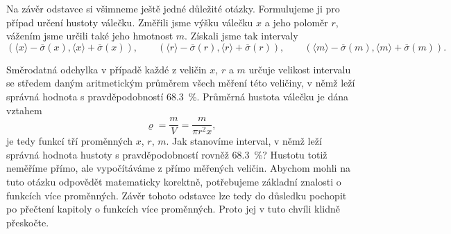       
      Na závěr odstavce si všimneme ještě jedné důležité otázky. Formulujeme ji pro případ určení
      hustoty válečku. Změřili jsme výšku válečku \(x\) a jeho poloměr \(r\), vážením jsme určili 
      také jeho hmotnost \(m\). Získali jsme tak intervaly
      \begin{equation*}
        \left(\langle x \rangle - \overline{\sigma}(x), 
              \langle x \rangle + \overline{\sigma}(x)\right), \qquad
        \left(\langle r \rangle - \overline{\sigma}(r), 
              \langle r \rangle + \overline{\sigma}(r)\right), \qquad
        \left(\langle m \rangle - \overline{\sigma}(m), 
              \langle m \rangle + \overline{\sigma}(m)\right).
      \end{equation*}
      
      Směrodatná odchylka v případě každé z veličin \(x\), \(r\) a \(m\) určuje velikost intervalu 
      se středem daným aritmetickým průměrem všech měření této veličiny, v němž leží správná 
      hodnota s pravděpodobností \SI{68.3}{\percent}. Průměrná hustota válečku je dána vztahem
      \begin{equation*}
        \varrho = \dfrac{m}{V} = \dfrac{m}{\pi r^2x},
      \end{equation*}
      je tedy funkcí tří proměnných \(x\), \(r\), \(m\). Jak stanovíme interval, v němž leží 
      správná hodnota hustoty s pravděpodobností rovněž \SI{68.3}{\percent}? Hustotu totiž neměříme 
      přímo, ale vypočítáváme z přímo měřených veličin. Abychom mohli na tuto otázku odpovědět 
      matematicky korektně, potřebujeme základní znalosti o funkcích více proměnných. Závěr tohoto 
      odstavce lze tedy do důsledku pochopit po přečtení kapitoly o funkcích více proměnných. Proto 
      jej v tuto chvíli klidně přeskočte.
      
